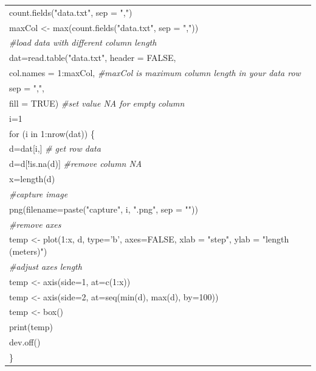 \documentclass[a4paper, 13pt]{report}
\begin{document}
\begin{enumerate}[label=\textbf{PL\arabic*}]
\begin{flushleft}
\begin{tabular}{ |l| }
count.fields("data.txt", sep = ",")\\
maxCol <- max(count.fields("data.txt", sep = ","))\\
\textit{\#load data with different column length}\\
dat=read.table("data.txt", header = FALSE, \\
\hspace{2cm} col.names = 1:maxCol, \textit{\#maxCol is maximum column length in your data row}\\ 				
\hspace{2cm} sep = ",",\\ 
\hspace{2cm} fill = TRUE) \textit{\#set value NA for empty column}\\
i=1\\
for (i in 1:nrow(dat)) \{ \\
  \hspace{1cm} d=dat[i,] \textit{\# get row data}\\
  \hspace{1cm} d=d[!is.na(d)] \textit{\#remove column NA}\\
  \hspace{1cm} x=length(d)\\
  \hspace{1cm} \textit{\#capture image}\\
  \hspace{1cm} png(filename=paste("capture", i, ".png", sep = ""))\\
  \hspace{1cm} \textit{\#remove axes}\\
  \hspace{1cm} temp <- plot(1:x, d, type='b', axes=FALSE, xlab = "step", ylab = "length (meters)")\\
  \hspace{1cm} \textit{\#adjust axes length}\\  
  \hspace{1cm} temp <- axis(side=1, at=c(1:x))\\
  \hspace{1cm} temp <- axis(side=2, at=seq(min(d), max(d), by=100))\\
  \hspace{1cm} temp <- box()\\
  \hspace{1cm} print(temp)\\
  \hspace{1cm} dev.off()\\
  \}
\\

\end{tabular}
\end{flushleft}
\end{enumerate}
\end{document}
